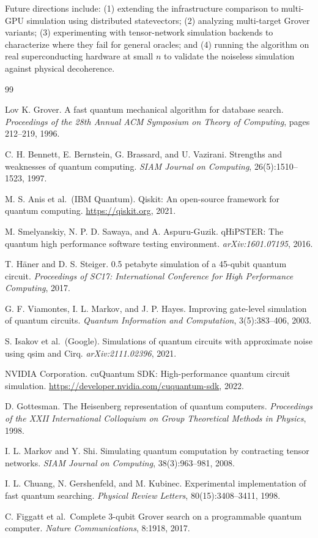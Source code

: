 \documentclass[sigconf, authorversion, nonacm]{acmart}
\begin{document}
Future directions include: (1) extending the infrastructure comparison to multi-GPU simulation using distributed statevectors; (2) analyzing multi-target Grover variants; (3) experimenting with tensor-network simulation backends to characterize where they fail for general oracles; and (4) running the algorithm on real superconducting hardware at small $n$ to validate the noiseless simulation against physical decoherence.

\begin{thebibliography}{99}

 Lov K. Grover. A fast quantum mechanical algorithm for database search. \textit{Proceedings of the 28th Annual ACM Symposium on Theory of Computing}, pages 212--219, 1996.

 C. H. Bennett, E. Bernstein, G. Brassard, and U. Vazirani. Strengths and weaknesses of quantum computing. \textit{SIAM Journal on Computing}, 26(5):1510--1523, 1997.

 M. S. Anis et al.\ (IBM Quantum). Qiskit: An open-source framework for quantum computing. \url{https://qiskit.org}, 2021.

 M. Smelyanskiy, N. P. D. Sawaya, and A. Aspuru-Guzik. qHiPSTER: The quantum high performance software testing environment. \textit{arXiv:1601.07195}, 2016.

 T. H\"{a}ner and D. S. Steiger. 0.5 petabyte simulation of a 45-qubit quantum circuit. \textit{Proceedings of SC17: International Conference for High Performance Computing}, 2017.

 G. F. Viamontes, I. L. Markov, and J. P. Hayes. Improving gate-level simulation of quantum circuits. \textit{Quantum Information and Computation}, 3(5):383--406, 2003.

 S. Isakov et al.\ (Google). Simulations of quantum circuits with approximate noise using qsim and Cirq. \textit{arXiv:2111.02396}, 2021.

 NVIDIA Corporation. cuQuantum SDK: High-performance quantum circuit simulation. \url{https://developer.nvidia.com/cuquantum-sdk}, 2022.

 D. Gottesman. The Heisenberg representation of quantum computers. \textit{Proceedings of the XXII International Colloquium on Group Theoretical Methods in Physics}, 1998.

 I. L. Markov and Y. Shi. Simulating quantum computation by contracting tensor networks. \textit{SIAM Journal on Computing}, 38(3):963--981, 2008.

 I. L. Chuang, N. Gershenfeld, and M. Kubinec. Experimental implementation of fast quantum searching. \textit{Physical Review Letters}, 80(15):3408--3411, 1998.

 C. Figgatt et al.\ Complete 3-qubit Grover search on a programmable quantum computer. \textit{Nature Communications}, 8:1918, 2017.

\end{thebibliography}
\end{document}
